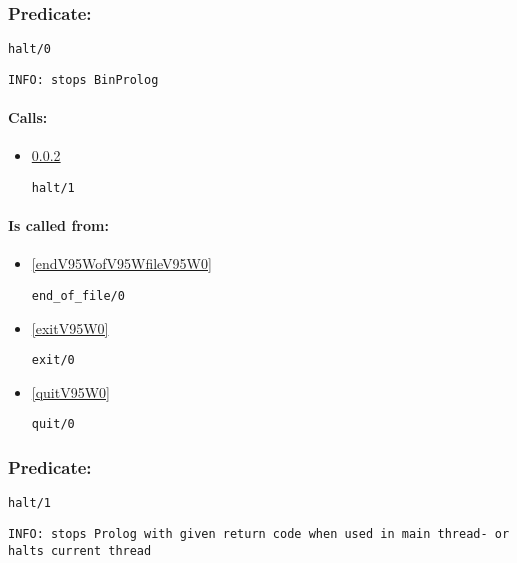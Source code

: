 \subsubsection{Predicate:} \label{haltV95W0}

\begin{verbatim}
halt/0
\end{verbatim}

{\small \begin{verbatim}
INFO: stops BinProlog

\end{verbatim}}
\paragraph{Calls:} 
\begin{itemize}
\item \ref{haltV95W1} 
\begin{verbatim}
halt/1
\end{verbatim}

\end{itemize}
\paragraph{Is called from:} 
\begin{itemize}
\item \ref{endV95WofV95WfileV95W0} 
\begin{verbatim}
end_of_file/0
\end{verbatim}

\item \ref{exitV95W0} 
\begin{verbatim}
exit/0
\end{verbatim}

\item \ref{quitV95W0} 
\begin{verbatim}
quit/0
\end{verbatim}

\end{itemize}

\subsubsection{Predicate:} \label{haltV95W1}

\begin{verbatim}
halt/1
\end{verbatim}

{\small \begin{verbatim}
INFO: stops Prolog with given return code when used in main thread- or halts current thread

\end{verbatim}}
